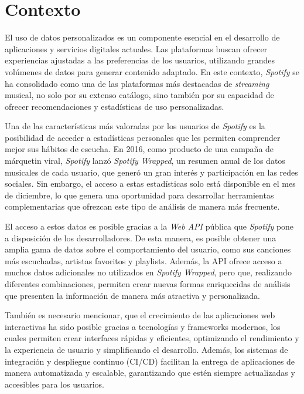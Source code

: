 \section{Contexto} \label{ch:contexto}

El uso de datos personalizados es un componente esencial en el desarrollo de aplicaciones y servicios digitales actuales. Las plataformas buscan ofrecer experiencias ajustadas a las preferencias de los usuarios, utilizando grandes volúmenes de datos para generar contenido adaptado. En este contexto, \textit{Spotify} se ha consolidado como una de las plataformas más destacadas de \textit{streaming} musical, no solo por su extenso catálogo, sino también por su capacidad de ofrecer recomendaciones y estadísticas de uso personalizadas.

Una de las características más valoradas por los usuarios de \textit{Spotify} es la posibilidad de acceder a estadísticas personales que les permiten comprender mejor sus hábitos de escucha. En 2016, como producto de una campaña de márquetin viral, \textit{Spotify} lanzó \textit{Spotify Wrapped}, un resumen anual de los datos musicales de cada usuario, que generó un gran interés y participación en las redes sociales. Sin embargo, el acceso a estas estadísticas solo está disponible en el mes de diciembre, lo que genera una oportunidad para desarrollar herramientas complementarias que ofrezcan este tipo de análisis de manera más frecuente.

El acceso a estos datos es posible gracias a la \textit{Web API} pública que \textit{Spotify} pone a disposición de los desarrolladores. De esta manera, es posible obtener una amplia gama de datos sobre el comportamiento del usuario, como sus canciones más escuchadas, artistas favoritos y playlists. Además, la API ofrece acceso a muchos datos adicionales no utilizados en \textit{Spotify Wrapped}, pero que, realizando diferentes combinaciones, permiten crear nuevas formas enriquecidas de análisis que presenten la información de manera más atractiva y personalizada.

También es necesario mencionar, que el crecimiento de las aplicaciones web interactivas ha sido posible gracias a tecnologías y frameworks modernos, los cuales permiten crear interfaces rápidas y eficientes, optimizando el
rendimiento y la experiencia de usuario y simplificando el desarrollo. Además, los sistemas de integración y despliegue continuo (CI/CD) facilitan la entrega de aplicaciones de manera automatizada y escalable, garantizando que estén siempre actualizadas y accesibles para los usuarios.

